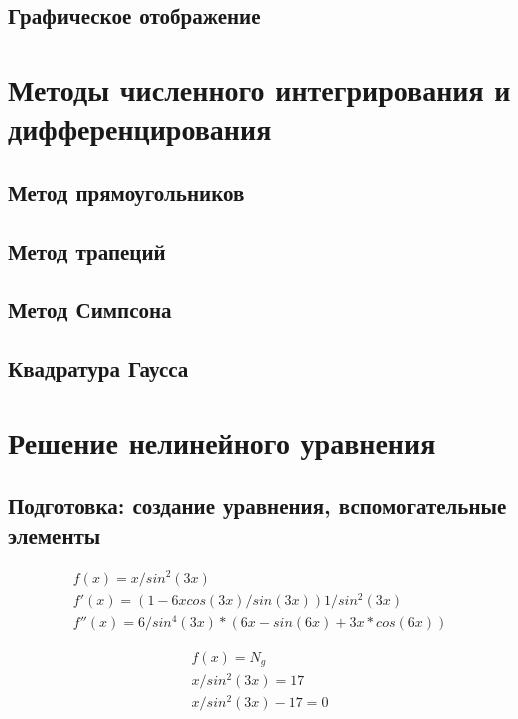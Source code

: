 \documentclass{article}
\begin{document}
\subsection{Графическое отображение}

\section{Методы численного интегрирования и дифференцирования}
\subsection{Метод прямоугольников}
\subsection{Метод трапеций}
\subsection{Метод Симпсона}
\subsection{Квадратура Гаусса}

\section{Решение нелинейного уравнения}
\subsection{Подготовка: создание уравнения, вспомогательные элементы}

\begin{displaymath}
  \begin{array}{ccc}
    f(x) = x / sin^2(3x)  \\
    f'(x) = (1 - 6x cos(3 x) / sin(3 x)) 1/sin^2(3 x)\\
    f''(x) = 6/sin^4(3x) * (6x - sin(6x) + 3x * cos(6x))
  \end{array}
\end{displaymath}

\begin{displaymath}
  \begin{array}{ccc}
    f(x) = N_{g}  \\
    x / sin^2(3x) = 17 \\
    x / sin^2(3x) - 17 = 0 \\
  \end{array}
\end{displaymath}
\end{document}
